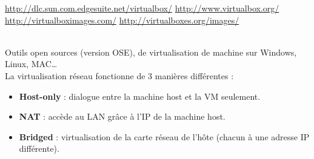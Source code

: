 \documentclass[a4paper,11pt]{article}				    %
\begin{document}
{
\url{http://dlc.sun.com.edgesuite.net/virtualbox/} \url{http://www.virtualbox.org/}\\
\url{http://virtualboximages.com/} \url{http://virtualboxes.org/images/}
}
{
\\Outils open sources (version OSE), de virtualisation de machine sur Windows, Linux, MAC\dots{}\\
La virtualisation r\'eseau fonctionne de 3 mani\`eres diff\'erentes :{\small
\begin{itemize}
	\item \textbf{Host-only} : dialogue entre la machine host et la VM seulement.
	\item \textbf{NAT} : acc\`ede au LAN gr\^ace \`a l'IP de la machine host.
	\item \textbf{Bridged} : virtualisation de la carte r\'eseau de l'h\^ote (chacun \`a une adresse IP diff\'erente).
\end{itemize}}
}
\end{document}
